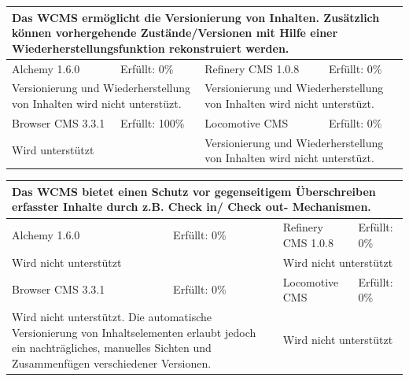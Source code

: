 \begin{tabular}[!ht]{|l|l|l|l|}
\hline
\multicolumn{4}{|p{15cm}|}{\textbf{Das WCMS ermöglicht die Versionierung von Inhalten. Zusätzlich können vorhergehende Zustände/Versionen mit Hilfe einer Wiederherstellungsfunktion rekonstruiert werden.}} \\
\hline
  Alchemy 1.6.0 & \cellcolor{red}Erfüllt: 0\% & Refinery CMS 1.0.8 & \cellcolor{red}Erfüllt: 0\% \\
  \hline
  \multicolumn{2}{|p{7.5cm}|}{Versionierung und Wiederherstellung von Inhalten wird nicht unterstüzt.} & \multicolumn{2}{p{7.5cm}|}{Versionierung und Wiederherstellung von Inhalten wird nicht unterstüzt.} \\
  \hline
  Browser CMS 3.3.1 & \cellcolor{green}Erfüllt: 100\% & Locomotive CMS & \cellcolor{red}Erfüllt: 0\% \\
  \hline
  \multicolumn{2}{|p{7.5cm}|}{Wird unterstützt} & \multicolumn{2}{p{7.5cm}|}{Versionierung und Wiederherstellung von Inhalten wird nicht unterstüzt.} \\
\hline
\end{tabular}
\newline
\newline
\newline
\begin{tabular}[!ht]{|l|l|l|l|}
\hline
\multicolumn{4}{|p{15cm}|}{\textbf{Das WCMS bietet einen Schutz vor gegenseitigem Überschreiben erfasster Inhalte durch z.B. Check in/ Check out- Mechanismen.}} \\
\hline
  Alchemy 1.6.0 & \cellcolor{red}Erfüllt: 0\% & Refinery CMS 1.0.8 & \cellcolor{red}Erfüllt: 0\% \\
  \hline
  \multicolumn{2}{|p{7.5cm}|}{Wird nicht unterstützt} & \multicolumn{2}{p{7.5cm}|}{Wird nicht unterstützt} \\
  \hline
  Browser CMS 3.3.1 & \cellcolor{red}Erfüllt: 0\% & Locomotive CMS & \cellcolor{red}Erfüllt: 0\% \\
  \hline
  \multicolumn{2}{|p{7.5cm}|}{Wird nicht unterstützt. Die automatische Versionierung von Inhaltselementen erlaubt jedoch ein nachträgliches, manuelles Sichten und Zusammenfügen  verschiedener Versionen.} & \multicolumn{2}{p{7.5cm}|}{Wird nicht unterstützt} \\
\hline
\end{tabular}
\newline
\newline
\newline
